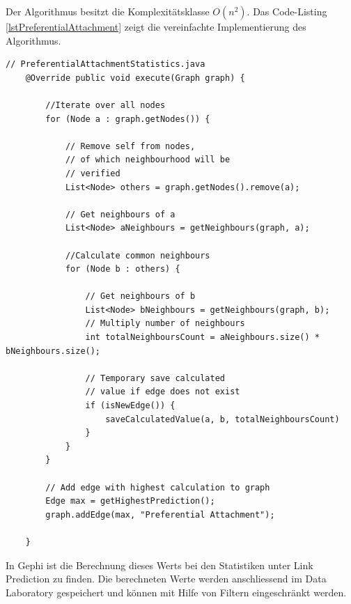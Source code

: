 Der Algorithmus besitzt die Komplexitätsklasse $O(n^2)$. Das Code-Listing \ref{lstPreferentialAttachment} zeigt die vereinfachte Implementierung des Algorithmus.

\begin{lstlisting}[caption={Preferential attachment implementation},label=lstPreferentialAttachment]
    // PreferentialAttachmentStatistics.java
    @Override public void execute(Graph graph) {

        //Iterate over all nodes
        for (Node a : graph.getNodes()) {

            // Remove self from nodes,
            // of which neighbourhood will be
            // verified
            List<Node> others = graph.getNodes().remove(a);

            // Get neighbours of a
            List<Node> aNeighbours = getNeighbours(graph, a);

            //Calculate common neighbours
            for (Node b : others) {

                // Get neighbours of b
                List<Node> bNeighbours = getNeighbours(graph, b);
                // Multiply number of neighbours
                int totalNeighboursCount = aNeighbours.size() * bNeighbours.size();

                // Temporary save calculated
                // value if edge does not exist
                if (isNewEdge()) {
                    saveCalculatedValue(a, b, totalNeighboursCount)
                }
            }
        }

        // Add edge with highest calculation to graph
        Edge max = getHighestPrediction();
        graph.addEdge(max, "Preferential Attachment");

    }
\end{lstlisting}

In Gephi ist die Berechnung dieses Werts bei den Statistiken unter Link Prediction zu finden. Die berechneten Werte
werden anschliessend im Data Laboratory gespeichert und können mit Hilfe von Filtern eingeschränkt werden.

